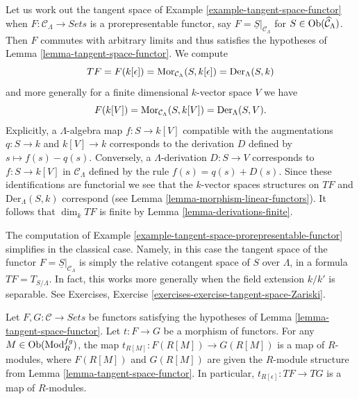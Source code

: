 \begin{example}
\label{example-tangent-space-prorepresentable-functor}
Let us work out the tangent space of
Example \ref{example-tangent-space-functor}
when $F : \mathcal{C}_\Lambda \to \textit{Sets}$ is a
prorepresentable functor, say $F = \underline{S}|_{\mathcal{C}_\Lambda}$
for $S \in \mathop{\mathrm{Ob}}\nolimits(\widehat{\mathcal{C}}_\Lambda)$. Then $F$ commutes
with arbitrary limits and thus satisfies the hypotheses of
Lemma \ref{lemma-tangent-space-functor}.
We compute
$$
TF = F(k[\epsilon]) = \mathop{\mathrm{Mor}}\nolimits_{\mathcal{C}_\Lambda}(S, k[\epsilon])
= \text{Der}_\Lambda(S, k)
$$
and more generally for a finite dimensional $k$-vector space $V$ we have
$$
F(k[V]) = \mathop{\mathrm{Mor}}\nolimits_{\mathcal{C}_\Lambda}(S, k[V]) = \text{Der}_\Lambda(S, V).
$$
Explicitly, a $\Lambda$-algebra map $f : S \to k[V]$ compatible with
the augmentations $q : S \to k$ and $k[V] \to k$ corresponds to the derivation
$D$ defined by $s \mapsto f(s) - q(s)$. Conversely, a
$\Lambda$-derivation $D : S \to V$ corresponds to $f : S \to k[V]$
in $\mathcal{C}_\Lambda$ defined by the rule $f(s) = q(s) + D(s)$. Since
these identifications are functorial we see that the $k$-vector spaces
structures on $TF$ and $\text{Der}_\Lambda(S, k)$ correspond (see
Lemma \ref{lemma-morphism-linear-functors}).
It follows that $\dim_k TF$ is finite by
Lemma \ref{lemma-derivations-finite}.
\end{example}

\begin{example}
\label{example-tangent-space-classical-prorepresentable-functor}
The computation of
Example \ref{example-tangent-space-prorepresentable-functor}
simplifies in the classical case. Namely, in this case
the tangent space of the functor
$F = \underline{S}|_{\mathcal{C}_\Lambda}$ is simply the
relative cotangent space of $S$ over $\Lambda$, in a formula
$TF = T_{S/\Lambda}$. In fact, this works more generally when the
field extension $k/k'$ is separable. See
Exercises, Exercise \ref{exercises-exercise-tangent-space-Zariski}.
\end{example}

\begin{lemma}
\label{lemma-morphism-tangent-spaces}
Let $F, G: \mathcal{C} \to \textit{Sets}$ be functors satisfying
the hypotheses of
Lemma \ref{lemma-tangent-space-functor}.
Let $t : F \to G$ be a morphism of functors. For any
$M \in \mathop{\mathrm{Ob}}\nolimits(\text{Mod}^{fg}_R)$, the map
$t_{R[M]}: F(R[M]) \to G(R[M])$ is a map of $R$-modules, where
$F(R[M])$ and $G(R[M])$ are given the $R$-module structure from
Lemma \ref{lemma-tangent-space-functor}.
In particular, $t_{R[\epsilon]} : TF \to TG$ is a map of $R$-modules.
\end{lemma}

